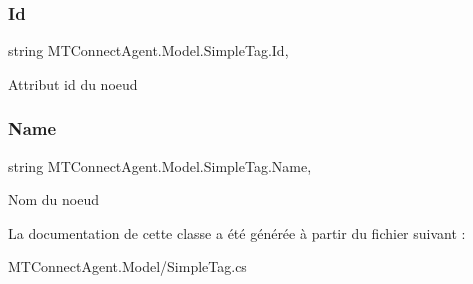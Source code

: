 \subsubsection{\texorpdfstring{Id}{Id}}
{\footnotesize\ttfamily string M\+T\+Connect\+Agent.\+Model.\+Simple\+Tag.\+Id\hspace{0.3cm}{\ttfamily [get]}, {\ttfamily [set]}}



Attribut id du noeud 

\mbox{\label{class_m_t_connect_agent_1_1_model_1_1_simple_tag_a6af48b2c6f3ab02d83de0c7cb2acb2e1}} 
\subsubsection{\texorpdfstring{Name}{Name}}
{\footnotesize\ttfamily string M\+T\+Connect\+Agent.\+Model.\+Simple\+Tag.\+Name\hspace{0.3cm}{\ttfamily [get]}, {\ttfamily [set]}}



Nom du noeud 



La documentation de cette classe a été générée à partir du fichier suivant \+:\begin{DoxyCompactItemize}
\item 
M\+T\+Connect\+Agent.\+Model/Simple\+Tag.\+cs\end{DoxyCompactItemize}
